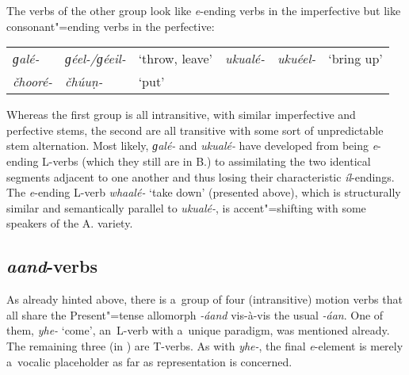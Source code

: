 The verbs of the other group look like \textit{e}-ending verbs in the imperfective but like consonant"=ending verbs in the perfective: 


\begin{table}[H]
\begin{tabularx}{\textwidth}{ Q l l Q Q l }

\textit{ɡalé-} &
\textit{ɡéel-/ɡéeil-} &
`throw, leave'{\protect\footnotemark} &
\textit{ukualé-} &
\textit{ukuéel-} &
`bring up'{\protect\footnotemark}\\
\textit{čhooré-} &
\textit{čhúuṇ-} &
`put' &
&
&
\\
\end{tabularx}
\end{table}

\addtocounter{footnote}{-2}

Whereas the first group is all intransitive, with similar imperfective and perfective stems, the second are all transitive with some sort of unpredictable stem alternation. Most likely, \textit{ɡalé-} and \textit{ukualé-} have developed from being \textit{e}-ending L-verbs (which they still are in B.) to assimilating the two identical segments adjacent to one another and thus losing their characteristic \textit{íl}-endings. The \textit{e}-ending L-verb \textit{whaalé-} `take down' (presented above), which is structurally similar and semantically parallel to \textit{ukualé-}, is accent"=shifting with some speakers of the A. variety. 


\subsection{\textit{aand}-verbs}
\label{subsec:8-3-8}


As already hinted above, there is a~group of four (intransitive) motion verbs that all share the Present"=tense allomorph \textit{-áand} vis-à-vis the usual \textit{-áan}. One of them, \textit{yhe-} `come', an~L-verb with a~unique paradigm, was mentioned already. The remaining three (in ) are T-verbs. As with \textit{yhe-}, the final \textit{e}-element is merely a~vocalic placeholder as far as representation is concerned.


